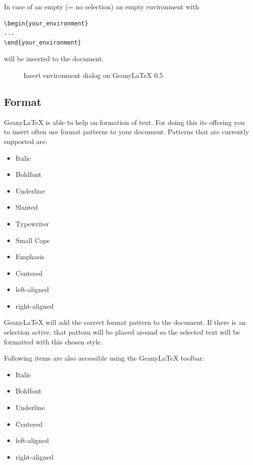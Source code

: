 \documentclass[%
paper=a4,%
fontsize=11pt,%
twoside=false,%
DIV18,%
headsepline,%
plainheadsepline,%
footsepline,%
plainfootsepline,%
bibliography=totoc,%
listof=totoc,%
BCOR10mm,%
parskip=half,%
openany,%
]{scrartcl}
\begin{document}
In case of an empty (= no selection) an empty environment with

\begin{lstlisting}
\begin{your_environment}
...
\end{your_environment}
\end{lstlisting}


will be inserted to the document.

\begin{figure}[h!]
	\caption{Insert environment dialog on Geany\LaTeX{} 0.5}
\end{figure}


\subsection{Format}
Geany\LaTeX{} is able to help on formation of text. For doing this its
offering you to insert often use format patterns to your document.
Patterns that are currently supported are:

\begin{itemize}
	\item Italic
	\item Boldfont
	\item Underline
	\item Slanted
	\item Typewriter
	\item Small Caps
	\item Emphasis
	\item Centered
	\item left-aligned
	\item right-aligned
\end{itemize}

Geany\LaTeX{} will add the correct format pattern to the document. If
there is an selection active, that pattern will be placed around so
the selected text will be formatted with this chosen style.

Following items are also accessible using the Geany\LaTeX{} toolbar:
\begin{itemize}
	\item Italic
	\item Boldfont
	\item Underline
	\item Centered
	\item left-aligned
	\item right-aligned
\end{itemize}
\end{document}

